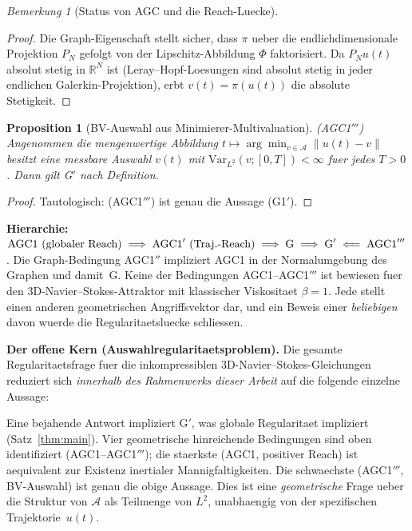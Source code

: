 \documentclass[12pt,a4paper]{article}
\theoremstyle{definition}
\theoremstyle{plain}
\newtheorem{proposition}[definition]{Proposition}
\theoremstyle{remark}
\newtheorem{remark}[definition]{Bemerkung}
\begin{document}
\begin{remark}[Status von AGC und die Reach-Luecke]
\begin{proof}
Die Graph-Eigenschaft stellt sicher, dass $\pi$ ueber die
endlichdimensionale Projektion $P_N$ gefolgt von der Lipschitz-Abbildung
$\Phi$ faktorisiert. Da $P_N u(t)$ absolut stetig in $\mathbb{R}^N$ ist (Leray--Hopf-Loesungen sind absolut stetig in jeder endlichen Galerkin-Projektion),
erbt $v(t) = \pi(u(t))$ die absolute Stetigkeit.
\end{proof}

\begin{proposition}[BV-Auswahl aus Minimierer-Multivaluation]
\label{prop:bv-selection}
\textup{(AGC1$'''$)}\;
Angenommen die mengenwertige Abbildung $t \mapsto \arg\min_{v \in \mathcal{A}}
\|u(t)-v\|$ besitzt eine messbare Auswahl $v(t)$ mit
$\mathrm{Var}_{L^2}(v; [0,T]) < \infty$ fuer jedes $T > 0$.
Dann gilt G$'$ nach Definition.
\end{proposition}

\begin{proof}
Tautologisch: (AGC1$'''$) ist genau die Aussage (G1$'$).
\end{proof}

\noindent
\textbf{Hierarchie:}\;
$\textup{AGC1 (globaler Reach)}
\;\Longrightarrow\;
\textup{AGC1}' \textup{ (Traj.-Reach)}
\;\Longrightarrow\;
\textup{G}
\;\Longrightarrow\;
\textup{G}'
\;\Longleftarrow\;
\textup{AGC1}'''$.
Die Graph-Bedingung AGC1$''$ impliziert AGC1 in der Normalumgebung des Graphen
und damit~G.
Keine der Bedingungen AGC1--AGC1$'''$ ist bewiesen fuer den 3D-Navier--Stokes-Attraktor
mit klassischer Viskositaet $\beta = 1$. Jede stellt einen anderen
geometrischen Angriffsvektor dar, und ein Beweis einer \emph{beliebigen} davon wuerde die
Regularitaetsluecke schliessen.

\medskip\noindent
\textbf{Der offene Kern (Auswahlregularitaetsproblem).}\;
Die gesamte Regularitaetsfrage fuer die inkompressiblen 3D-Navier--Stokes-Gleichungen
reduziert sich \emph{innerhalb des Rahmenwerks dieser Arbeit} auf die
folgende einzelne Aussage:

\begin{center}
\end{center}

\noindent
Eine bejahende Antwort impliziert G$'$, was globale Regularitaet impliziert
(Satz~\ref{thm:main}). Vier geometrische hinreichende Bedingungen sind
oben identifiziert (AGC1--AGC1$'''$); die staerkste (AGC1, positiver Reach)
ist aequivalent zur Existenz inertialer Mannigfaltigkeiten. Die schwaechste
(AGC1$'''$, BV-Auswahl) ist genau die obige Aussage.
Dies ist eine \emph{geometrische} Frage ueber die Struktur von
$\mathcal{A}$ als Teilmenge von $L^2$, unabhaengig von der spezifischen
Trajektorie~$u(t)$.


\end{remark}
\end{document}
